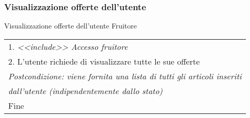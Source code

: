 \begin{minipage}{\textwidth}
    \subsubsection{Visualizzazione offerte dell'utente}
    \usecase
        {Visualizzazione offerte dell'utente}
        {
            Fruitore
        }
        {
            \begin{tabular}{l}
                1. \textit{<<include>> Accesso fruitore}\\
                2. L'utente richiede di visualizzare tutte le sue offerte\\
                \textit{Postcondizione: viene fornita una lista di tutti gli articoli inseriti}\\
                \textit{dall'utente (indipendentemente dallo stato)}\\
                Fine
            \end{tabular}

        }
        \vspace{0.5cm}
\end{minipage}